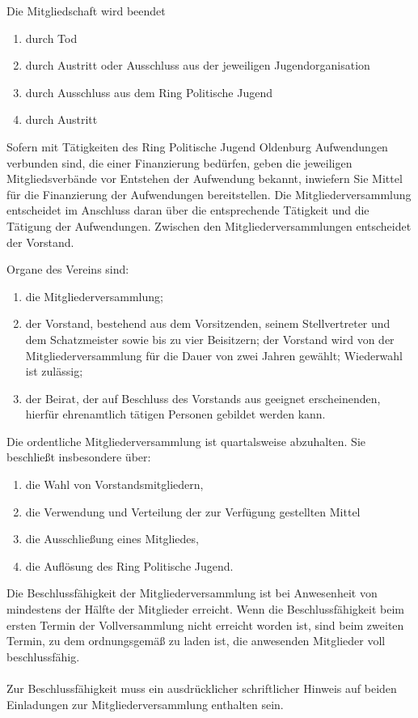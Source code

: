 \documentclass[10pt,a4paper,oneside,parskip=half]{scrartcl}
\begin{document}
\begin{contract}
Die Mitgliedschaft wird beendet
\begin{enumerate}
\item durch Tod
\item durch Austritt oder Ausschluss aus der jeweiligen Jugendorganisation
\item durch Ausschluss aus dem Ring Politische Jugend
\item durch Austritt
\end{enumerate}

Sofern mit Tätigkeiten des Ring Politische Jugend Oldenburg Aufwendungen verbunden sind, die einer Finanzierung bedürfen, geben die jeweiligen Mitgliedsverbände vor Entstehen der Aufwendung bekannt, inwiefern Sie Mittel für die Finanzierung der Aufwendungen bereitstellen. Die Mitgliederversammlung entscheidet im Anschluss daran über die entsprechende Tätigkeit und die Tätigung der Aufwendungen. Zwischen den Mitgliederversammlungen entscheidet der Vorstand.

Organe des Vereins sind:
\begin{enumerate}
\item die Mitgliederversammlung;
\item der Vorstand, bestehend aus dem Vorsitzenden, seinem Stellvertreter und dem Schatzmeister sowie bis zu vier Beisitzern; der Vorstand wird von der Mitgliederversammlung für die Dauer von zwei Jahren gewählt; Wiederwahl ist zulässig;
\item der Beirat, der auf Beschluss des Vorstands aus geeignet erscheinenden, hierfür ehrenamtlich tätigen Personen gebildet werden kann.
\end{enumerate}

Die ordentliche Mitgliederversammlung ist quartalsweise abzuhalten. Sie beschließt insbesondere über:
\begin{enumerate}
\item die Wahl von Vorstandsmitgliedern,
\item die Verwendung und Verteilung der zur Verfügung gestellten Mittel
\item die Ausschließung eines Mitgliedes,
\item die Auflösung des Ring Politische Jugend.
\end{enumerate}

Die Beschlussfähigkeit der Mitgliederversammlung ist bei Anwesenheit von mindestens der Hälfte der Mitglieder erreicht. Wenn die Beschlussfähigkeit beim ersten Termin der Vollversammlung nicht erreicht worden ist, sind beim zweiten Termin, zu dem ordnungsgemäß zu laden ist, die anwesenden Mitglieder voll beschlussfähig.\\
\\
Zur Beschlussfähigkeit muss ein ausdrücklicher schriftlicher Hinweis auf beiden Einladungen zur Mitgliederversammlung enthalten sein.


\end{contract}
\end{document}

